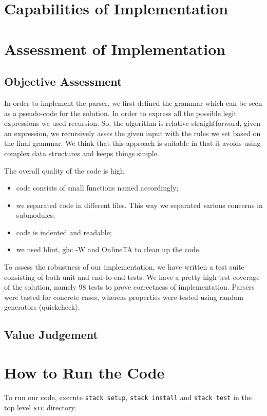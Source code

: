 \documentclass{article}
\begin{document}
\section{Capabilities of Implementation}



\section{Assessment of Implementation}

\subsection{Objective Assessment}
In order to implement the parser, we first defined the grammar which can be seen as a pseudo-code for the solution. In order to express all the possible legit expressions we used recursion. So, the algorithm is relative straightforward, given an expression, we recursively asses the given input with the rules we set based on the final grammar. We think that this approach is suitable in that it avoids using complex data structures and keeps things simple.

The overall quality of the code is high: 
\begin{itemize}
	\item code consists of small functions named accordingly;
	\item we separated code in different files. This way we separated various concerns in submodules;
	\item code is indented and readable;
	\item we used hlint, ghc -W and OnlineTA to clean up the code.
\end{itemize}
 
To assess the robustness of our implementation, we have written a test suite consisting of both unit and end-to-end tests.
We have a pretty high test coverage of the solution, namely 98 tests to prove correctness of implementation. Parsers were tasted for concrete cases, whereas properties were tested using random generators (quickcheck).

\subsection{Value Judgement}


\section{How to Run the Code}
To run our code, execute \texttt{stack setup}, \texttt{stack install} and \texttt{stack test} in the top level \texttt{src} directory.
\end{document}
